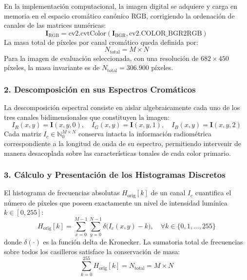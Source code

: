 \documentclass{article}
\begin{document}
En la implementación computacional, la imagen digital se adquiere y carga en memoria en el espacio cromático canónico RGB, corrigiendo la ordenación de canales de las matrices numéricas:
\begin{equation}
    \mathbf{I}_{\text{RGB}} = \text{cv2.cvtColor}(\mathbf{I}_{\text{BGR}}, \text{cv2.COLOR\_BGR2RGB})
\end{equation}
La masa total de píxeles por canal cromático queda definida por:
\begin{equation}
    N_{\text{total}} = M \times N
\end{equation}
Para la imagen de evaluación seleccionada, con una resolución de $682 \times 450$ píxeles, la masa invariante es de $N_{\text{total}} = 306.900$ píxeles.

\subsubsection{2. Descomposición en sus Espectros Cromáticos}
La descomposición espectral consiste en aislar algebraicamente cada uno de los tres canales bidimensionales que constituyen la imagen:
\begin{equation}
    I_R(x, y) = \mathbf{I}(x, y, 0), \quad I_G(x, y) = \mathbf{I}(x, y, 1), \quad I_B(x, y) = \mathbf{I}(x, y, 2)
\end{equation}
Cada matriz $I_c \in \mathbb{N}_0^{M \times N}$ conserva intacta la información radiométrica correspondiente a la longitud de onda de su espectro, permitiendo intervenir de manera desacoplada sobre las características tonales de cada color primario.

\subsubsection{3. Cálculo y Presentación de los Histogramas Discretos}
El histograma de frecuencias absolutas $H_{\text{orig}}[k]$ de un canal $I_c$ cuantifica el número de píxeles que poseen exactamente un nivel de intensidad lumínica $k \in [0, 255]$:
\begin{equation}
    H_{\text{orig}}[k] = \sum_{x=0}^{M-1} \sum_{y=0}^{N-1} \delta\big(I_c(x, y) - k\big), \quad \forall k \in \{0, 1, \dots, 255\}
\end{equation}
donde $\delta(\cdot)$ es la función delta de Kronecker. La sumatoria total de frecuencias sobre todos los casilleros satisface la conservación de masa:
\begin{equation}
    \sum_{k=0}^{255} H_{\text{orig}}[k] = N_{\text{total}} = M \times N
\end{equation}
\end{document}
